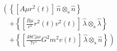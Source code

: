 \begin{align*}&\left( \left\{ \left[ A \mu r^{2}{\left (t \right )} \right]\, \hat{n} \otimes_{\mathrm{s}} \hat{n} \right\} \right. \nonumber \\&\quad \left. + \left\{ \left[ \frac{B \mu}{c^{2}} r^{2}{\left (t \right )} v^{2}{\left (t \right )} \right]\, \hat{\lambda} \otimes_{\mathrm{s}} \hat{\lambda} \right\} \right. \nonumber \\&\quad \left. + \left\{ \left[ \frac{48 C \mu \nu}{7 c^{5}} G^{2} m^{2} v{\left (t \right )} \right]\, \hat{\lambda} \otimes_{\mathrm{s}} \hat{n} \right\} \right)\\\end{align*}